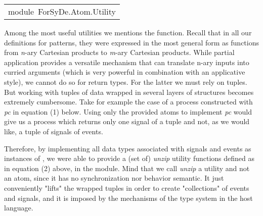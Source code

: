 \begin{haddockdesc}
\item[\begin{tabular}{@{}l}
module\ ForSyDe.Atom.Utility
\end{tabular}]
\end{haddockdesc}
Among the most useful utilities we mentions the 
 function. Recall that in all our definitions for patterns, they
 were expressed in the most general form as functions from \emph{n}-ary
 Cartesian products to \emph{m}-ary Cartesian products. While partial
 application provides a versatile mechanism that can translate
 n-ary inputs into curried arguments (which is very powerful in
 combination with an applicative style), we cannot do so for
 return types. For the latter we must rely on tuples. But working
 with tuples of data wrapped in several layers of structures
 becomes extremely cumbersome. Take for example the case of a
 process constructed with \emph{pc} in equation (1) below. Using only
 the provided atoms to implement \emph{pc} would give us a process
 which returns only one signal of a tuple and not, as we would
 like, a tuple of signals of events.\par
{}\par
Therefore, by implementing all data types associated with signals
 and events as instances of , we were able to provide a
 (set of) \emph{unzip} utility functions defined as in equation (2)
 above, in the  module.  Mind that we call
 \emph{unzip} a utility and not an atom, since it has no
 synchronization nor behavior semantic. It just conveniently
 "lifts" the wrapped tuples in order to create "collections" of
 events and signals, and it is imposed by the mechanisms of the
 type system in the host language.\par

